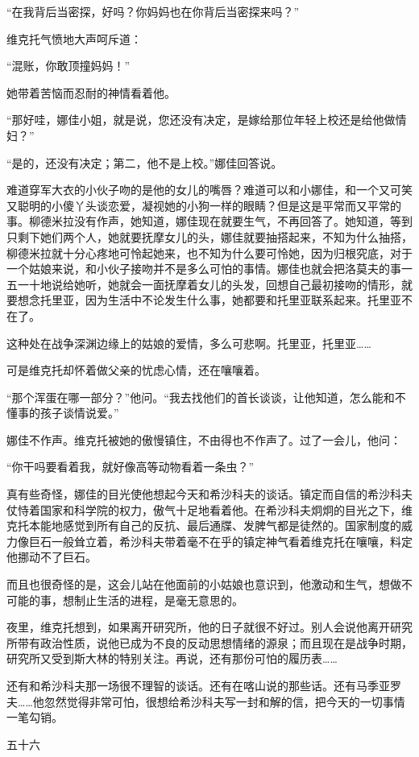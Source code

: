 “在我背后当密探，好吗？你妈妈也在你背后当密探来吗？”

维克托气愤地大声呵斥道：

“混账，你敢顶撞妈妈！”

她带着苦恼而忍耐的神情看着他。

“那好哇，娜佳小姐，就是说，您还没有决定，是嫁给那位年轻上校还是给他做情妇？”

“是的，还没有决定；第二，他不是上校。”娜佳回答说。

难道穿军大衣的小伙子吻的是他的女儿的嘴唇？难道可以和小娜佳，和一个又可笑又聪明的小傻丫头谈恋爱，凝视她的小狗一样的眼睛？但是这是平常而又平常的事。柳德米拉没有作声，她知道，娜佳现在就要生气，不再回答了。她知道，等到只剩下她们两个人，她就要抚摩女儿的头，娜佳就要抽搭起来，不知为什么抽搭，柳德米拉就十分心疼地可怜起她来，也不知为什么要可怜她，因为归根究底，对于一个姑娘来说，和小伙子接吻并不是多么可怕的事情。娜佳也就会把洛莫夫的事一五一十地说给她听，她就会一面抚摩着女儿的头发，回想自己最初接吻的情形，就要想念托里亚，因为生活中不论发生什么事，她都要和托里亚联系起来。托里亚不在了。

这种处在战争深渊边缘上的姑娘的爱情，多么可悲啊。托里亚，托里亚……

可是维克托却怀着做父亲的忧虑心情，还在嚷嚷着。

“那个浑蛋在哪一部分？”他问。“我去找他们的首长谈谈，让他知道，怎么能和不懂事的孩子谈情说爱。”

娜佳不作声。维克托被她的傲慢镇住，不由得也不作声了。过了一会儿，他问：

“你干吗要看着我，就好像高等动物看着一条虫？”

真有些奇怪，娜佳的目光使他想起今天和希沙科夫的谈话。镇定而自信的希沙科夫仗恃着国家和科学院的权力，傲气十足地看着他。在希沙科夫炯炯的目光之下，维克托本能地感觉到所有自己的反抗、最后通牒、发脾气都是徒然的。国家制度的威力像巨石一般耸立着，希沙科夫带着毫不在乎的镇定神气看着维克托在嚷嚷，料定他挪动不了巨石。

而且也很奇怪的是，这会儿站在他面前的小姑娘也意识到，他激动和生气，想做不可能的事，想制止生活的进程，是毫无意思的。

夜里，维克托想到，如果离开研究所，他的日子就很不好过。别人会说他离开研究所带有政治性质，说他已成为不良的反动思想情绪的源泉；而且现在是战争时期，研究所又受到斯大林的特别关注。再说，还有那份可怕的履历表……

还有和希沙科夫那一场很不理智的谈话。还有在喀山说的那些话。还有马季亚罗夫……他忽然觉得非常可怕，很想给希沙科夫写一封和解的信，把今天的一切事情一笔勾销。

五十六

